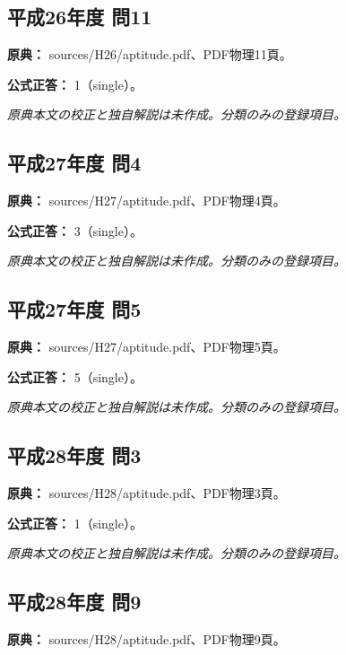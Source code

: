 \subsection{平成26年度 問11}
\label{q:h26-reg-apt-11}

\noindent\textbf{原典：} sources/H26/aptitude.pdf、PDF物理11頁。

\textbf{公式正答：} 1（single）。

\par\textit{原典本文の校正と独自解説は未作成。分類のみの登録項目。}

\subsection{平成27年度 問4}
\label{q:h27-reg-apt-04}

\noindent\textbf{原典：} sources/H27/aptitude.pdf、PDF物理4頁。

\textbf{公式正答：} 3（single）。

\par\textit{原典本文の校正と独自解説は未作成。分類のみの登録項目。}

\subsection{平成27年度 問5}
\label{q:h27-reg-apt-05}

\noindent\textbf{原典：} sources/H27/aptitude.pdf、PDF物理5頁。

\textbf{公式正答：} 5（single）。

\par\textit{原典本文の校正と独自解説は未作成。分類のみの登録項目。}

\subsection{平成28年度 問3}
\label{q:h28-reg-apt-03}

\noindent\textbf{原典：} sources/H28/aptitude.pdf、PDF物理3頁。

\textbf{公式正答：} 1（single）。

\par\textit{原典本文の校正と独自解説は未作成。分類のみの登録項目。}

\subsection{平成28年度 問9}
\label{q:h28-reg-apt-09}

\noindent\textbf{原典：} sources/H28/aptitude.pdf、PDF物理9頁。

